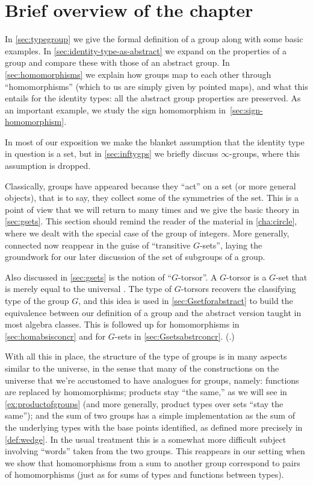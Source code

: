 \section{Brief overview of the chapter}
In \cref{sec:typegroup} we give the formal definition of a group 
along with some basic examples.
In \cref{sec:identity-type-as-abstract} we expand on the properties of a group
and compare these with those of an abstract group.
In \cref{sec:homomorphisms} we explain how groups map to each other through
``homomorphisms'' (which to us are simply given by pointed maps),
and what this entails for the identity types: 
all the abstract group properties are preserved.
As an important example, we study the sign homomorphism 
in~\cref{sec:sign-homomorphism}.

In most of our exposition we make the blanket assumption that the identity type in question is a set, but in \cref{sec:inftygps} we briefly discuss $\infty$-groups, where this assumption is dropped.

Classically, groups have appeared because they ``act'' on a set 
(or more general objects), that is to say, they collect some of the
symmetries of the set. This is a point of view that we will return to
many times and we give the basic theory in \cref{sec:gsets}.
This section should remind the reader of the material in \cref{cha:circle},
where we dealt with the special case of the group of integers.
More generally, connected \coverings now reappear in the guise of
``transitive $G$-sets'', laying the groundwork for our later discussion 
of the set of subgroups of a group.

Also discussed in \cref{sec:gsets} is the notion of ``$G$-torsor''.
A $G$-torsor is a $G$-set that is merely equal to the universal \covering.
The type of $G$-torsors recovers the classifying type of the group $G$,
and this idea is used in \cref{sec:Gsetforabstract} to build the equivalence between our definition of a group and the abstract version taught in most algebra classes.  This is followed up for homomorphisms in \cref{sec:homabsisconcr} and for $G$-sets in \cref{sec:Gsetsabstrconcr}.
(.)


With all this in place, the structure of the type of groups is in many aspects similar to the universe, in the sense that many of the constructions on the universe that we're accustomed to have analogues for groups, namely:
functions are replaced by homomorphisms;
products stay ``the same,'' as we will see in \cref{ex:productofgroups}
(and more generally, product types over sets ``stay the same'');
and the sum of two groups has a simple implementation as the sum of the underlying types with the base points identified, as defined more precisely in \cref{def:wedge}.
In the usual treatment this is a somewhat more difficult subject involving ``words'' taken from the two groups.
This reappears in our setting when we show that homomorphisms
from a sum to another group
correspond to pairs of homomorphisms
(just as for sums of types and functions between types).

